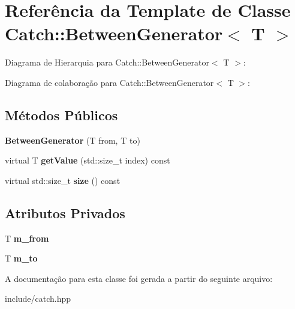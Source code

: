 \hypertarget{classCatch_1_1BetweenGenerator}{}\section{Referência da Template de Classe Catch\+:\+:Between\+Generator$<$ T $>$}
\label{classCatch_1_1BetweenGenerator}


Diagrama de Hierarquia para Catch\+:\+:Between\+Generator$<$ T $>$\+:


Diagrama de colaboração para Catch\+:\+:Between\+Generator$<$ T $>$\+:
\subsection*{Métodos Públicos}
\begin{DoxyCompactItemize}
\item 
{\bfseries Between\+Generator} (T from, T to)\hypertarget{classCatch_1_1BetweenGenerator_a835a057d691ae37caef660624099b51c}{}\label{classCatch_1_1BetweenGenerator_a835a057d691ae37caef660624099b51c}

\item 
virtual T {\bfseries get\+Value} (std\+::size\+\_\+t index) const \hypertarget{classCatch_1_1BetweenGenerator_af83575d62cc727ca995446cff4d6c26c}{}\label{classCatch_1_1BetweenGenerator_af83575d62cc727ca995446cff4d6c26c}

\item 
virtual std\+::size\+\_\+t {\bfseries size} () const \hypertarget{classCatch_1_1BetweenGenerator_aa53a04a259e796ba2b5adabed79474b5}{}\label{classCatch_1_1BetweenGenerator_aa53a04a259e796ba2b5adabed79474b5}

\end{DoxyCompactItemize}
\subsection*{Atributos Privados}
\begin{DoxyCompactItemize}
\item 
T {\bfseries m\+\_\+from}\hypertarget{classCatch_1_1BetweenGenerator_ad9948a93e1354cd26b2001c3fa507d8a}{}\label{classCatch_1_1BetweenGenerator_ad9948a93e1354cd26b2001c3fa507d8a}

\item 
T {\bfseries m\+\_\+to}\hypertarget{classCatch_1_1BetweenGenerator_ac9d5c73f8ff0f4b31b908d87c66be3e2}{}\label{classCatch_1_1BetweenGenerator_ac9d5c73f8ff0f4b31b908d87c66be3e2}

\end{DoxyCompactItemize}


A documentação para esta classe foi gerada a partir do seguinte arquivo\+:\begin{DoxyCompactItemize}
\item 
include/catch.\+hpp\end{DoxyCompactItemize}
